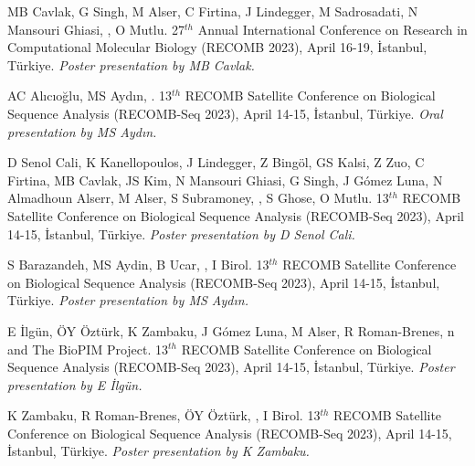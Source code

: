 \vspace{-.2cm}{\bf TargetCall: eliminating the wasted computation in basecalling via pre-basecalling filtering.} MB Cavlak, G Singh, M Alser, C Firtina, J Lindegger, M Sadrosadati, N Mansouri Ghiasi,  \calkan{}, O Mutlu. 27$^{th}$ Annual International Conference on Research in Computational Molecular Biology (RECOMB 2023), April 16-19, İstanbul, Türkiye. {\it Poster presentation by MB Cavlak.}


\vspace{-.2cm}{\bf Pairwise sequence alignment with block and character edit operations.} AC Alıcıoğlu, MS Aydın, \calkan{}. 13$^{th}$ RECOMB Satellite Conference on Biological Sequence Analysis (RECOMB-Seq 2023), April 14-15, İstanbul, Türkiye. {\it Oral presentation by MS Aydın.}

\vspace{-.2cm}{\bf SeGraM: a universal hardware accelerator for genomic sequence-to-graph and sequence-to-sequence mapping.} D Senol Cali, K Kanellopoulos, J Lindegger, Z Bingöl, GS Kalsi, Z Zuo, C Firtina, MB Cavlak, JS Kim, N Mansouri Ghiasi, G Singh, J Gómez Luna, N Almadhoun Alserr, M Alser, S Subramoney, \calkan{}, S Ghose, O Mutlu. 13$^{th}$ RECOMB Satellite Conference on Biological Sequence Analysis (RECOMB-Seq 2023), April 14-15, İstanbul, Türkiye. {\it Poster presentation by D Senol Cali.}

\vspace{-.2cm}{\bf Using minimizer interarrival distances for read-until human read detection from blood samples sequenced by Oxford Nanopore.} S Barazandeh, MS Aydin, B Ucar, \calkan{}, I Birol. 13$^{th}$ RECOMB Satellite Conference on Biological Sequence Analysis (RECOMB-Seq 2023), April 14-15, İstanbul, Türkiye. {\it Poster presentation by MS Aydın.}

\vspace{-.2cm}{\bf Characterization of alignment and search algorithms for short read, long read, and graph mappers.} E İlgün, ÖY Öztürk, K Zambaku, J Gómez Luna, M Alser, R Roman-Brenes, \calkan{}n and The BioPIM Project. 13$^{th}$ RECOMB Satellite Conference on Biological Sequence Analysis (RECOMB-Seq 2023), April 14-15, İstanbul, Türkiye. {\it Poster presentation by E İlgün.}

 K Zambaku, R Roman-Brenes, ÖY Öztürk, \calkan{}, I Birol. 13$^{th}$ RECOMB Satellite Conference on Biological Sequence Analysis (RECOMB-Seq 2023), April 14-15, İstanbul, Türkiye. {\it Poster presentation by K Zambaku.}



